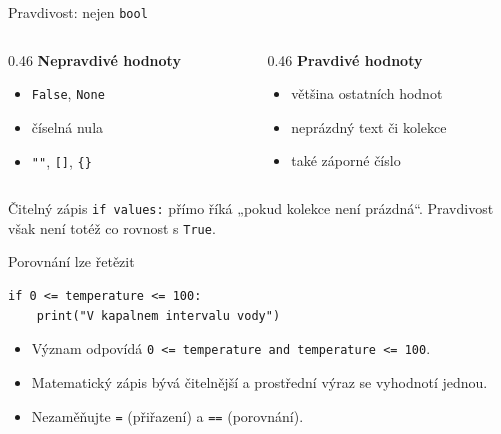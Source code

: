 \documentclass[aspectratio=169,t]{beamer}
\begin{document}
\begin{frame}{Pravdivost: nejen \texttt{bool}}
  \begin{columns}[T]
    \begin{column}{0.46\textwidth}
      \textbf{Nepravdivé hodnoty}
      \begin{itemize}
        \item \texttt{False}, \texttt{None}
        \item číselná nula
        \item \texttt{""}, \texttt{[]}, \texttt{\{\}}
      \end{itemize}
    \end{column}
    \begin{column}{0.46\textwidth}
      \textbf{Pravdivé hodnoty}
      \begin{itemize}
        \item většina ostatních hodnot
        \item neprázdný text či kolekce
        \item také záporné číslo
      \end{itemize}
    \end{column}
  \end{columns}
  \begin{alertblock}{Čitelný zápis}
    \texttt{if values:} přímo říká „pokud kolekce není prázdná“.
    Pravdivost však není totéž co rovnost s \texttt{True}.
  \end{alertblock}
\end{frame}

\begin{frame}[fragile]{Porovnání lze řetězit}
\begin{lstlisting}[style=python]
if 0 <= temperature <= 100:
    print("V kapalnem intervalu vody")
\end{lstlisting}
  \begin{itemize}
    \item Význam odpovídá \texttt{0 <= temperature and temperature <= 100}.
    \item Matematický zápis bývá čitelnější a prostřední výraz se vyhodnotí jednou.
    \item Nezaměňujte \texttt{=} (přiřazení) a \texttt{==} (porovnání).
  \end{itemize}
\end{frame}
\end{document}
